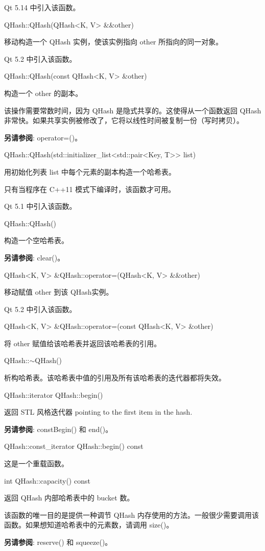 Qt 5.14 中引入该函数。

QHash::QHash(QHash<K, V> \&\&other)

移动构造一个 QHash 实例，使该实例指向 other 所指向的同一对象。

Qt 5.2 中引入该函数。

QHash::QHash(const QHash<K, V> \&other)

构造一个 other 的副本。

该操作需要常数时间，因为 QHash 是隐式共享的。这使得从一个函数返回 QHash 非常快。如果共享实例被修改了，它将以线性时间被复制一份（写时拷贝）。

\textbf{另请参阅}: operator=()。

QHash::QHash(std::initializer\_list<std::pair<Key, T>> list)

用初始化列表 list 中每个元素的副本构造一个哈希表。

只有当程序在 C++11 模式下编译时，该函数才可用。

Qt 5.1 中引入该函数。

QHash::QHash()

构造一个空哈希表。

\textbf{另请参阅}: clear()。

QHash<K, V> \&QHash::operator=(QHash<K, V> \&\&other)

移动赋值 other 到该 QHash实例。

Qt 5.2 中引入该函数。

QHash<K, V> \&QHash::operator=(const QHash<K, V> \&other)

将 other 赋值给该哈希表并返回该哈希表的引用。

QHash::$\sim$QHash()

析构哈希表。该哈希表中值的引用及所有该哈希表的迭代器都将失效。

QHash::iterator QHash::begin()

返回 STL 风格迭代器 pointing to the first item in the hash.

\textbf{另请参阅}: constBegin() 和 end()。

QHash::const\_iterator QHash::begin() const

这是一个重载函数。

int QHash::capacity() const

返回 QHash 内部哈希表中的 bucket 数。

该函数的唯一目的是提供一种调节 QHash 内存使用的方法。一般很少需要调用该函数。如果想知道哈希表中的元素数，请调用 size()。

\textbf{另请参阅}: reserve() 和 squeeze()。

